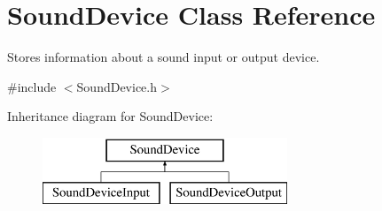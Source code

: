 \hypertarget{class_sound_device}{
\section{SoundDevice Class Reference}
\label{class_sound_device}
}


Stores information about a sound input or output device.  




{\ttfamily \#include $<$SoundDevice.h$>$}

Inheritance diagram for SoundDevice:\begin{figure}[H]
\begin{center}
\leavevmode
\includegraphics[height=2.000000cm]{class_sound_device}
\end{center}
\end{figure}
